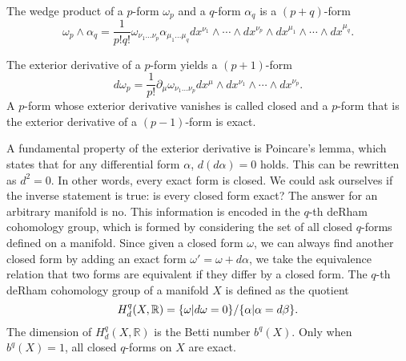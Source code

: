 The wedge product of a $p$-form $\omega_p$ and a $q$-form $\alpha_q$ is a $(p+q)$-form
\begin{equation}
  \omega_p \wedge \alpha_q  = \frac{1}{p!q!}\omega_{\nu_1\ldots\nu_p}
\alpha_{\mu_1\ldots\mu_q}dx^{\nu_1}\wedge \cdots  \wedge dx^{\nu_p}\wedge dx^{\mu_1}\wedge \cdots  \wedge dx^{\mu_q}.
\end{equation}

The exterior derivative of a $p$-form yields a $(p+1)$-form
\begin{equation}
  d\omega_p = \frac{1}{p!}\partial_\mu \omega_{\nu_1\ldots\nu_p}dx^\mu\wedge dx^{\nu_1}\wedge\cdots\wedge dx^{\nu_p}.
\end{equation}
A $p$-form whose exterior derivative vanishes is called closed and a $p$-form that is the exterior derivative
of a $(p-1)$-form is exact.

A fundamental property of the exterior derivative is Poincare's lemma, which states that for any differential form $\alpha$, $d(d\alpha)=0$ holds.
This can be rewritten as $d^2=0$. In other words, every exact form is closed.
We could ask ourselves if the inverse statement is true:
is every closed form exact?
The answer for an arbitrary manifold is no.%
This information is encoded in the $q$-th deRham cohomology group, which is formed by considering
the set of all closed $q$-forms defined on a manifold.
Since given a closed form $\omega$, we can always find another closed form by adding an exact form
$\omega' = \omega+d\alpha$, we take the equivalence relation that two forms are equivalent if
they differ by a closed form.
The $q$-th deRham cohomology group of a manifold $X$ is defined as the quotient
\begin{equation}
  H^q_d(X,\mathbb R)=\qty{\omega| d\omega=0}/\qty{\alpha|\alpha=d\beta}.
\end{equation}
The dimension of $H^q_d(X,\mathbb R)$ is the Betti number $b^q(X)$.
Only when $b^q(X)=1$, all closed $q$-forms on $X$ are exact.


